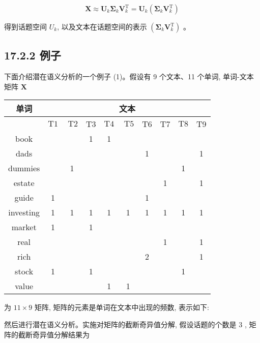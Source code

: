\documentclass[10pt]{article}
\begin{document}
\begin{equation*}
\boldsymbol{X} \approx \boldsymbol{U}_{k} \boldsymbol{\Sigma}_{k} \boldsymbol{V}_{k}^{\mathrm{T}}=\boldsymbol{U}_{k}\left(\boldsymbol{\Sigma}_{k} \boldsymbol{V}_{k}^{\mathrm{T}}\right) \tag{17.16}
\end{equation*}


得到话题空间 $U_{k}$, 以及文本在话题空间的表示 $\left(\boldsymbol{\Sigma}_{k} \boldsymbol{V}_{k}^{\mathrm{T}}\right)$ 。

\subsection*{17.2.2 例子}
下面介绍潜在语义分析的一个例子 (1)。假设有 9 个文本、11 个单词, 单词-文本矩阵 $\boldsymbol{X}$

\begin{center}
\begin{tabular}{|c|c|c|c|c|c|c|c|c|c|}
\hline
\multirow{2}{*}{单词} & \multicolumn{9}{|c|}{文本} \\
\hline
 & $\mathrm{T} 1$ & $\mathrm{~T} 2$ & T3 & $\mathrm{T} 4$ & $\mathrm{~T} 5$ & T6 & T7 & $\mathrm{T} 8$ & T9 \\
\hline
book &  &  & 1 & 1 &  &  &  &  &  \\
\hline
dads &  &  &  &  &  & 1 &  &  & 1 \\
\hline
dummies &  & 1 &  &  &  &  &  & 1 &  \\
\hline
estate &  &  &  &  &  &  & 1 &  & 1 \\
\hline
guide & 1 &  &  &  &  & 1 &  &  &  \\
\hline
investing & 1 & 1 & 1 & 1 & 1 & 1 & 1 & 1 & 1 \\
\hline
market & 1 &  & 1 &  &  &  &  &  &  \\
\hline
real &  &  &  &  &  &  & 1 &  & 1 \\
\hline
rich &  &  &  &  &  & 2 &  &  & 1 \\
\hline
stock & 1 &  & 1 &  &  &  &  & 1 &  \\
\hline
value &  &  &  & 1 & 1 &  &  &  &  \\
\hline
\end{tabular}
\end{center}

为 $11 \times 9$ 矩阵, 矩阵的元素是单词在文本中出现的频数, 表示如下:

然后进行潜在语义分析。实施对矩阵的截断奇异值分解, 假设话题的个数是 3 , 矩阵的截断奇异值分解结果为
\end{document}
